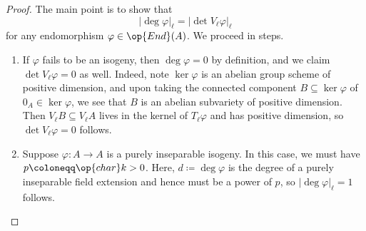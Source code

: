 \documentclass{amsart}
\begin{document}
\begin{proof}
	The main point is to show that
	\begin{equation}
		\left|\deg\varphi\right|_\ell=\left|\det V_\ell\varphi\right|_\ell \label{eq:desired-to-give-char-coherence}
	\end{equation}
	for any endomorphism $\varphi\in\op{End}(A)$. We proceed in steps.
	\begin{enumerate}
		\item If $\varphi$ fails to be an isogeny, then $\deg\varphi=0$ by definition, and we claim $\det V_\ell\varphi=0$ as well. Indeed, note $\ker\varphi$ is an abelian group scheme of positive dimension, and upon taking the connected component $B\subseteq\ker\varphi$ of $0_A\in\ker\varphi$, we see that $B$ is an abelian subvariety of positive dimension. Then $V_\ell B\subseteq V_\ell A$ lives in the kernel of $T_\ell\varphi$ and has positive dimension, so $\det V_\ell\varphi=0$ follows.
		\item Suppose $\varphi\colon A\to A$ is a purely inseparable isogeny. In this case, we must have $p\coloneqq\op{char}k>0$. Here, $d\coloneqq\deg\varphi$ is the degree of a purely inseparable field extension and hence must be a power of $p$, so $\left|\deg\varphi\right|_\ell=1$ follows.
		

\end{enumerate}
\end{proof}
\end{document}

